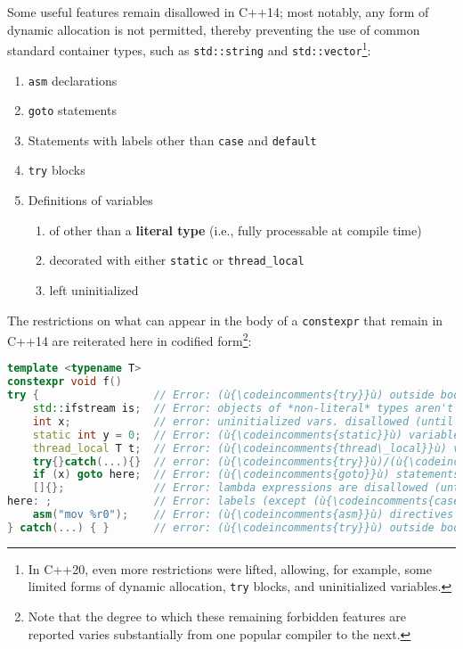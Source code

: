\noindent Some useful features remain disallowed in C++14; most notably, any form
of dynamic allocation is not permitted, thereby preventing the use of
common standard container types, such as \texttt{std::string} and
\texttt{std::vector}{\cprotect\footnote{In C++20, even more
restrictions were lifted, allowing, for example, some limited forms of
  dynamic allocation, \texttt{try} blocks, and uninitialized variables.}}:
\begin{enumerate}
\item{\texttt{asm} declarations}
\item{\texttt{goto} statements}
\item{Statements with labels other than \texttt{case} and \texttt{default}}
\item{\texttt{try} blocks}
\item{Definitions of variables
\begin{enumerate}
\item{of other than a \textbf{literal type} (i.e., fully processable at compile time)}
\item{decorated with either \texttt{static} or \texttt{thread\_local}}
\item{left uninitialized}
\end{enumerate}
}
\end{enumerate}
The restrictions on what can appear in the body of a \texttt{constexpr}
that remain in C++14 are reiterated here in codified
form\footnote{Note that the degree to which these remaining forbidden features are reported varies substantially from one popular compiler to the next.}:

\begin{lstlisting}[language=C++]
template <typename T>
constexpr void f()
try {                  // Error: (ù{\codeincomments{try}}ù) outside body isn't allowed (until C++20).
    std::ifstream is;  // Error: objects of *non-literal* types aren't allowed.
    int x;             // error: uninitialized vars. disallowed (until C++20)
    static int y = 0;  // Error: (ù{\codeincomments{static}}ù) variables are disallowed.
    thread_local T t;  // Error: (ù{\codeincomments{thread\_local}}ù) variables are disallowed.
    try{}catch(...){}  // error: (ù{\codeincomments{try}}ù)/(ù{\codeincomments{catch}}ù) disallowed (until C++20)
    if (x) goto here;  // Error: (ù{\codeincomments{goto}}ù) statements are disallowed.
    []{};              // Error: lambda expressions are disallowed (until C++17).
here: ;                // Error: labels (except (ù{\codeincomments{case}}ù)/(ù{\codeincomments{default}}ù)) aren't allowed.
    asm("mov %r0");    // Error: (ù{\codeincomments{asm}}ù) directives are disallowed.
} catch(...) { }       // error: (ù{\codeincomments{try}}ù) outside body disallowed (until C++20)
\end{lstlisting}


